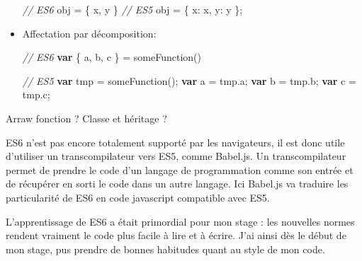 \documentclass[12pt,a4paper]{article}
\newenvironment{Shaded}{}{}
\newcommand{\KeywordTok}[1]{\textcolor[rgb]{0.00,0.44,0.13}{\textbf{{#1}}}}
\newcommand{\DataTypeTok}[1]{\textcolor[rgb]{0.56,0.13,0.00}{{#1}}}
\newcommand{\CommentTok}[1]{\textcolor[rgb]{0.38,0.63,0.69}{\textit{{#1}}}}
\newcommand{\VariableTok}[1]{\textcolor[rgb]{0.10,0.09,0.49}{{#1}}}
\newcommand{\OperatorTok}[1]{\textcolor[rgb]{0.40,0.40,0.40}{{#1}}}
\newcommand{\AttributeTok}[1]{\textcolor[rgb]{0.49,0.56,0.16}{{#1}}}
\newcommand{\NormalTok}[1]{{#1}}
\begin{document}
\begin{itemize}
  \begin{Shaded}
  \begin{Highlighting}[]
  \CommentTok{// ES6}
  \NormalTok{obj }\OperatorTok{=} \OperatorTok{\{} \NormalTok{x}\OperatorTok{,} \NormalTok{y }\OperatorTok{\}}
  \CommentTok{// ES5}
  \NormalTok{obj }\OperatorTok{=} \OperatorTok{\{} \DataTypeTok{x}\OperatorTok{:} \NormalTok{x}\OperatorTok{,} \DataTypeTok{y}\OperatorTok{:} \NormalTok{y }\OperatorTok{\};}
  \end{Highlighting}
  \end{Shaded}
  \item
    Affectation par décomposition:

  \begin{Shaded}
  \begin{Highlighting}[]
  \CommentTok{// ES6}
  \KeywordTok{var} \OperatorTok{\{} \NormalTok{a}\OperatorTok{,} \NormalTok{b}\OperatorTok{,} \NormalTok{c }\OperatorTok{\}} \OperatorTok{=} \AttributeTok{someFunction}\NormalTok{()}

  \CommentTok{// ES5}
  \KeywordTok{var} \NormalTok{tmp }\OperatorTok{=} \AttributeTok{someFunction}\NormalTok{()}\OperatorTok{;}
  \KeywordTok{var} \NormalTok{a  }\OperatorTok{=} \VariableTok{tmp}\NormalTok{.}\AttributeTok{a}\OperatorTok{;}
  \KeywordTok{var} \NormalTok{b }\OperatorTok{=} \VariableTok{tmp}\NormalTok{.}\AttributeTok{b}\OperatorTok{;}
  \KeywordTok{var} \NormalTok{c }\OperatorTok{=} \VariableTok{tmp}\NormalTok{.}\AttributeTok{c}\OperatorTok{;}
  \end{Highlighting}
  \end{Shaded}
  \end{itemize}

  Arraw fonction ? Classe et héritage ?

  \bigskip

  ES6 n'est pas encore totalement supporté par les navigateurs, il est
  donc utile d'utiliser un transcompilateur vers ES5, comme Babel.js. Un
  transcompilateur permet de prendre le code d'un langage de programmation
  comme son entrée et de récupérer en sorti le code dans un autre langage.
  Ici Babel.js va traduire les particularité de ES6 en code javascript
  compatible avec ES5.

  \bigskip

  L'apprentissage de ES6 a était primordial pour mon stage : les nouvelles
  normes rendent vraiment le code plus facile à lire et à écrire. J'ai
  ainsi dès le début de mon stage, pus prendre de bonnes habitudes quant
  au style de mon code.
\end{document}
